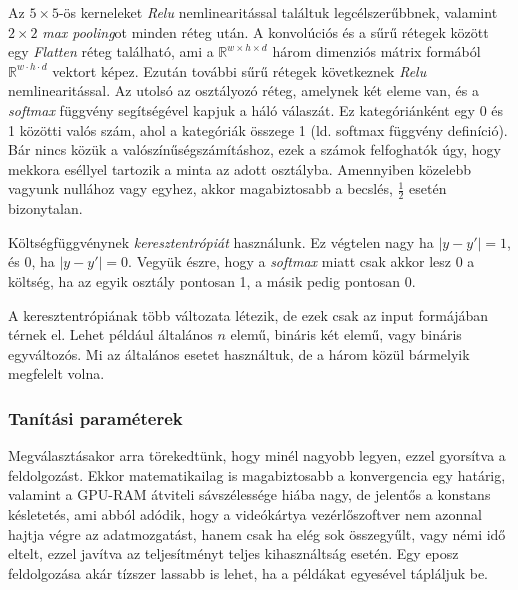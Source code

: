 Az $ 5 \times 5 $-ös kerneleket \textit{Relu} nemlinearitással találtuk legcélszerűbbnek,
valamint $ 2 \times 2 $ \textit{max pooling}ot minden réteg után.
A konvolúciós és a sűrű rétegek között egy \textit{Flatten} réteg található,
ami a $ \mathbb{R}^{w \times h \times d} $ három dimenziós mátrix formából 
$ \mathbb{R}^{w \cdot h \cdot d} $ vektort képez. Ezután további sűrű rétegek
következnek \textit{Relu} nemlinearitással. Az utolsó az osztályozó
réteg, amelynek két eleme van, és a \textit{softmax} függvény segítségével kapjuk
a háló válaszát. Ez kategóriánként egy 0 és 1 közötti valós szám, ahol a kategóriák 
összege 1 (ld. softmax függvény definíció). Bár nincs közük a valószínűségszámításhoz, 
ezek a számok felfoghatók úgy, hogy mekkora eséllyel tartozik a minta az adott osztályba.
Amennyiben közelebb vagyunk nullához vagy egyhez, akkor magabiztosabb a becslés, 
$ \frac{1}{2} $ esetén bizonytalan.

Költségfüggvénynek \textit{keresztentrópiát} használunk. Ez végtelen nagy ha $ |y-y'|=1 $,
és 0, ha $ |y-y'|=0 $. Vegyük észre, hogy a \textit{softmax} miatt csak akkor lesz 0
a költség, ha az egyik osztály pontosan 1, a másik pedig pontosan 0.

A keresztentrópiának több változata létezik, de ezek csak az input formájában térnek
el. Lehet például általános $ n $ elemű, bináris két elemű, vagy bináris egyváltozós.
Mi az általános esetet használtuk, de a három közül bármelyik megfelelt volna.


\subsubsection{Tanítási paraméterek}



\nopagebreak

Megválasztásakor arra törekedtünk, hogy minél nagyobb legyen, ezzel gyorsítva a feldolgozást.
Ekkor matematikailag is magabiztosabb a konvergencia egy határig, 
valamint a GPU-RAM átviteli sávszélessége hiába nagy, de jelentős a konstans késletetés, 
ami abból adódik, hogy a videókártya vezérlőszoftver nem azonnal hajtja végre az adatmozgatást,
hanem csak ha elég sok összegyűlt, vagy némi idő eltelt, ezzel javítva az teljesítményt teljes 
kihasználtság esetén. Egy eposz feldolgozása akár tízszer lassabb is lehet, ha a példákat
egyesével tápláljuk be.



